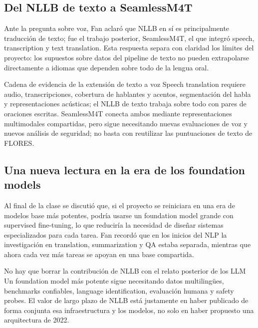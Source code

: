 \subsection{Del NLLB de texto a SeamlessM4T}

Ante la pregunta sobre voz, Fan aclaró que NLLB en sí es principalmente traducción de texto; fue el trabajo posterior, SeamlessM4T, el que integró speech, transcription y text translation. Esta respuesta separa con claridad los límites del proyecto: los supuestos sobre datos del pipeline de texto no pueden extrapolarse directamente a idiomas que dependen sobre todo de la lengua oral.

\begin{knowledgebox}{Cadena de evidencia de la extensión de texto a voz}
Speech translation requiere audio, transcripciones, cobertura de hablantes y acentos, segmentación del habla y representaciones acústicas; el NLLB de texto trabaja sobre todo con pares de oraciones escritas. SeamlessM4T conecta ambos mediante representaciones multimodales compartidas, pero sigue necesitando nuevas evaluaciones de voz y nuevos análisis de seguridad; no basta con reutilizar las puntuaciones de texto de FLORES.
\end{knowledgebox}

\subsection{Una nueva lectura en la era de los foundation models}

Al final de la clase se discutió que, si el proyecto se reiniciara en una era de modelos base más potentes, podría usarse un foundation model grande con supervised fine-tuning, lo que reduciría la necesidad de diseñar sistemas especializados para cada tarea. Fan recordó que en los inicios del NLP la investigación en translation, summarization y QA estaba separada, mientras que ahora cada vez más tareas se apoyan en una base compartida.


\begin{warningbox}{No hay que borrar la contribución de NLLB con el relato posterior de los LLM}
Un foundation model más potente sigue necesitando datos multilingües, benchmarks confiables, language identification, evaluación humana y safety probes. El valor de largo plazo de NLLB está justamente en haber publicado de forma conjunta esa infraestructura y los modelos, no solo en haber propuesto una arquitectura de 2022.
\end{warningbox}


